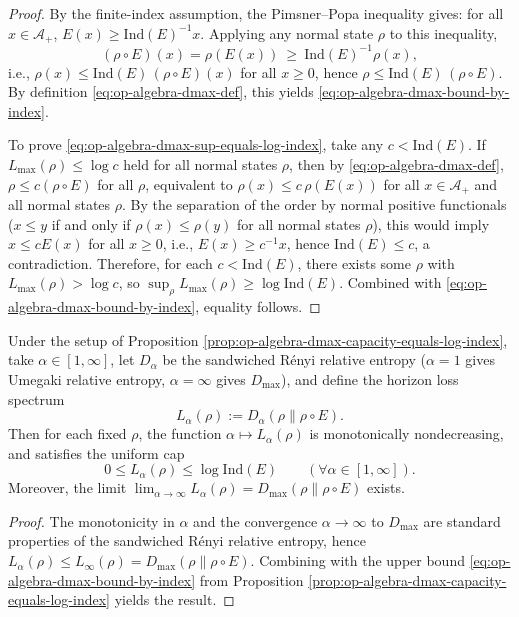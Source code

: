 \begin{proof}
By the finite-index assumption, the Pimsner--Popa inequality gives: for all \(x\in\mathcal{A}_+\),
\(
E(x)\ge \mathrm{Ind}(E)^{-1}x
\).
Applying any normal state \(\rho\) to this inequality,
\[
(\rho\!\circ\!E)(x)=\rho(E(x))\ \ge\ \mathrm{Ind}(E)^{-1}\rho(x),
\]
i.e., \(\rho(x)\le \mathrm{Ind}(E)\,(\rho\!\circ\!E)(x)\) for all \(x\ge0\),
hence \(\rho\le \mathrm{Ind}(E)\,(\rho\!\circ\!E)\).
By definition \eqref{eq:op-algebra-dmax-def}, this yields \eqref{eq:op-algebra-dmax-bound-by-index}.
\par
To prove \eqref{eq:op-algebra-dmax-sup-equals-log-index}, take any \(c<\mathrm{Ind}(E)\).
If \(L_{\max}(\rho)\le \log c\) held for all normal states \(\rho\), then by \eqref{eq:op-algebra-dmax-def}, \(\rho\le c(\rho\!\circ\!E)\) for all \(\rho\),
equivalent to \(\rho(x)\le c\,\rho(E(x))\) for all \(x\in\mathcal{A}_+\) and all normal states \(\rho\).
By the separation of the order by normal positive functionals (\(x\le y\) if and only if \(\rho(x)\le \rho(y)\) for all normal states \(\rho\)), this would imply \(x\le cE(x)\) for all \(x\ge0\),
i.e., \(E(x)\ge c^{-1}x\), hence \(\mathrm{Ind}(E)\le c\), a contradiction.
Therefore, for each \(c<\mathrm{Ind}(E)\), there exists some \(\rho\) with \(L_{\max}(\rho)>\log c\), so
\(\sup_{\rho}L_{\max}(\rho)\ge \log\mathrm{Ind}(E)\).
Combined with \eqref{eq:op-algebra-dmax-bound-by-index}, equality follows. \qedhere
\end{proof}

\begin{corollary}\label{cor:op-algebra-renyi-loss-spectrum-capped-by-index}
Under the setup of Proposition \ref{prop:op-algebra-dmax-capacity-equals-log-index},
take \(\alpha\in[1,\infty]\), let \(D_\alpha\) be the sandwiched R\'enyi relative entropy (\(\alpha=1\) gives Umegaki relative entropy, \(\alpha=\infty\) gives \(D_{\max}\)), and define the horizon loss spectrum
\[
L_\alpha(\rho):=D_\alpha(\rho\|\rho\!\circ\!E).
\]
Then for each fixed \(\rho\), the function \(\alpha\mapsto L_\alpha(\rho)\) is monotonically nondecreasing, and satisfies the uniform cap
\[
\boxed{\;
0\le L_\alpha(\rho)\le \log\mathrm{Ind}(E)\qquad(\forall \alpha\in[1,\infty]).\;}
\]
Moreover, the limit \(\lim_{\alpha\to\infty}L_\alpha(\rho)=D_{\max}(\rho\|\rho\!\circ\!E)\) exists.
\end{corollary}
\begin{proof}
The monotonicity in \(\alpha\) and the convergence \(\alpha\to\infty\) to \(D_{\max}\) are standard properties of the sandwiched R\'enyi relative entropy, hence
\(
L_\alpha(\rho)\le L_\infty(\rho)=D_{\max}(\rho\|\rho\!\circ\!E)
\).
Combining with the upper bound \eqref{eq:op-algebra-dmax-bound-by-index} from Proposition \ref{prop:op-algebra-dmax-capacity-equals-log-index} yields the result. \qedhere
\end{proof}

